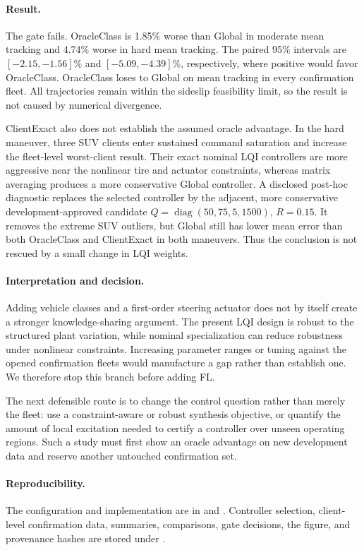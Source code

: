 \paragraph{Result.}
The gate fails. OracleClass is 1.85\% worse than Global in moderate mean
tracking and 4.74\% worse in hard mean tracking. The paired 95\% intervals are
$[-2.15,-1.56]\%$ and $[-5.09,-4.39]\%$, respectively, where positive would
favor OracleClass. OracleClass loses to Global on mean tracking in every
confirmation fleet. All trajectories remain within the sideslip feasibility
limit, so the result is not caused by numerical divergence.

ClientExact also does not establish the assumed oracle advantage. In the hard
maneuver, three SUV clients enter sustained command saturation and increase
the fleet-level worst-client result. Their exact nominal LQI controllers are
more aggressive near the nonlinear tire and actuator constraints, whereas
matrix averaging produces a more conservative Global controller. A disclosed
post-hoc diagnostic replaces the selected controller by the adjacent, more
conservative development-approved candidate
$Q=\operatorname{diag}(50,75,5,1500)$, $R=0.15$. It removes the extreme SUV
outliers, but Global still has lower mean error than both OracleClass and
ClientExact in both maneuvers. Thus the conclusion is not rescued by a small
change in LQI weights.

\paragraph{Interpretation and decision.}
Adding vehicle classes and a first-order steering actuator does not by itself
create a stronger knowledge-sharing argument. The present LQI design is robust
to the structured plant variation, while nominal specialization can reduce
robustness under nonlinear constraints. Increasing parameter ranges or tuning
against the opened confirmation fleets would manufacture a gap rather than
establish one. We therefore stop this branch before adding FL.

The next defensible route is to change the control question rather than merely
the fleet: use a constraint-aware or robust synthesis objective, or quantify
the amount of local excitation needed to certify a controller over unseen
operating regions. Such a study must first show an oracle advantage on new
development data and reserve another untouched confirmation set.

\paragraph{Reproducibility.}
The configuration and implementation are in
 and
. Controller
selection, client-level confirmation data, summaries, comparisons, gate
decisions, the figure, and provenance hashes are stored under
.
